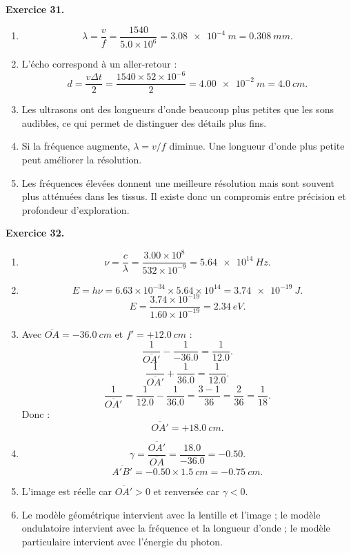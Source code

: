 \documentclass[11pt,a4paper]{article}
\newcommand{\corr}[2]{
  \begin{correctionbox}
  \textbf{Exercice #1.} #2
  \end{correctionbox}
}
\begin{document}
\corr{31}{
\begin{enumerate}
  \item
  \[
  \lambda=\frac{v}{f}
  =\frac{1540}{5.0\times 10^6}
  =\SI{3.08e-4}{m}
  =\SI{0.308}{mm}.
  \]
  \item L'écho correspond à un aller-retour :
  \[
  d=\frac{v\Delta t}{2}
  =\frac{1540\times 52\times 10^{-6}}{2}
  =\SI{4.00e-2}{m}
  =\SI{4.0}{cm}.
  \]
  \item Les ultrasons ont des longueurs d'onde beaucoup plus petites que les sons audibles, ce qui permet de distinguer des détails plus fins.
  \item Si la fréquence augmente, $\lambda=v/f$ diminue. Une longueur d'onde plus petite peut améliorer la résolution.
  \item Les fréquences élevées donnent une meilleure résolution mais sont souvent plus atténuées dans les tissus. Il existe donc un compromis entre précision et profondeur d'exploration.
\end{enumerate}
}

\corr{32}{
\begin{enumerate}
  \item
  \[
  \nu=\frac{c}{\lambda}
  =\frac{3.00\times 10^8}{532\times 10^{-9}}
  =\SI{5.64e14}{Hz}.
  \]
  \item
  \[
  E=h\nu=6.63\times 10^{-34}\times 5.64\times 10^{14}
  =\SI{3.74e-19}{J}.
  \]
  \[
  E=\frac{3.74\times 10^{-19}}{1.60\times 10^{-19}}
  =\SI{2.34}{eV}.
  \]
  \item Avec $\overline{OA}=-\SI{36.0}{cm}$ et $f'=+\SI{12.0}{cm}$ :
  \[
  \frac{1}{\overline{OA'}}-\frac{1}{-36.0}=\frac{1}{12.0}.
  \]
  \[
  \frac{1}{\overline{OA'}}+\frac{1}{36.0}=\frac{1}{12.0}.
  \]
  \[
  \frac{1}{\overline{OA'}}=\frac{1}{12.0}-\frac{1}{36.0}
  =\frac{3-1}{36}=\frac{2}{36}=\frac{1}{18}.
  \]
  Donc :
  \[
  \overline{OA'}=+\SI{18.0}{cm}.
  \]
  \item
  \[
  \gamma=\frac{\overline{OA'}}{\overline{OA}}
  =\frac{18.0}{-36.0}=-0.50.
  \]
  \[
  \overline{A'B'}=-0.50\times \SI{1.5}{cm}
  =-\SI{0.75}{cm}.
  \]
  \item L'image est réelle car $\overline{OA'}>0$ et renversée car $\gamma<0$.
  \item Le modèle géométrique intervient avec la lentille et l'image ; le modèle ondulatoire intervient avec la fréquence et la longueur d'onde ; le modèle particulaire intervient avec l'énergie du photon.
\end{enumerate}
}
\end{document}
